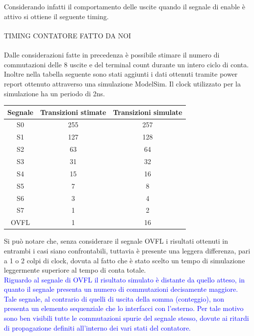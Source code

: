 \documentclass[11pt,  english, makeidx, a4paper, titlepage, oneside]{book}
\begin{document}
\\\\
Considerando infatti il comportamento delle uscite quando il segnale di 
enable è attivo si ottiene il seguente timing.
\\\\
TIMING CONTATORE FATTO DA NOI
\\\\
Dalle considerazioni fatte in precedenza è possibile stimare il numero
di commutazioni delle 8 uscite e del terminal count durante 
un intero ciclo di conta. Inoltre nella tabella seguente sono stati
aggiunti i dati ottenuti tramite power report ottenuto attraverso 
una simulazione ModelSim. Il clock utilizzato per la simulazione ha un periodo
di 2ns.
\\
\begin{center}
	\begin{tabular}{|c|c|c|}
	\hline
	Segnale & Transizioni stimate & Transizioni simulate \\ 
	\hline
	S0 & 255 & 257 \\
	\hline
	S1 & 127 & 128\\
	\hline
	S2 & 63 & 64\\
	\hline
	S3 & 31 & 32\\
	\hline
	S4 & 15 & 16 \\
	\hline
	S5 & 7 & 8 \\
	\hline
	S6 & 3 & 4 \\
	\hline
	S7 & 1 & 2 \\
	\hline
	OVFL & 1 & 16 \\
	\hline
	\end{tabular}
\end{center}
\vspace{0.3cm}
Si può notare che, senza considerare il segnale OVFL
i risultati ottenuti in entrambi i casi siano
confrontabili, tuttavia è presente una leggera differenza, pari
a 1 o 2 colpi di clock, dovuta al fatto che è stato scelto un 
tempo di simulazione leggermente superiore al tempo di conta 
totale.
\\
\textcolor{blue}{Riguardo al segnale di OVFL il risultato simulato
è distante da quello atteso, in quanto il segnale presenta un numero di commutazioni
decisamente maggiore. Tale segnale, al contrario di quelli di uscita della somma (conteggio), non 
presenta un elemento sequenziale che lo interfacci con l'esterno. Per tale motivo
sono ben visibili tutte le commutazioni spurie del segnale stesso, dovute ai ritardi
di propagazione definiti all'interno dei vari stati del contatore.}
\end{document}
